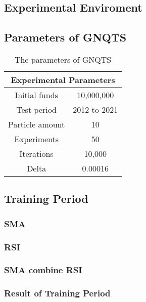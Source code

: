 \documentclass[../main.tex]{subfiles}
\begin{document}
\subsection{Experimental Enviroment}

\subsection{Parameters of GNQTS}

\begin{table}[H]
    \centering
    \caption{The parameters of GNQTS}
    \label{para}
    \footnotesize
    \begin{tabular}{cc}
        \toprule
        \multicolumn{2}{c}{\textbf{Experimental Parameters}} \\
        \midrule
        Initial funds   & 10,000,000                         \\
        Test period     & 2012 to 2021                       \\
        Particle amount & 10                                 \\
        Experiments     & 50                                 \\
        Iterations      & 10,000                             \\
        Delta           & 0.00016                            \\
        \bottomrule
    \end{tabular}
\end{table}

\subsection{Training Period}


\subsubsection{SMA}


\subsubsection{RSI}


\subsubsection{SMA combine RSI}


\subsubsection{Result of Training Period}
\end{document}
